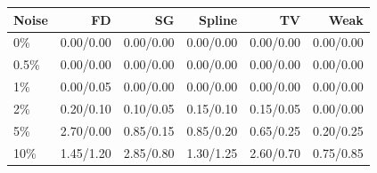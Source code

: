 \begin{tabular}{lrrrrr}\toprule
Noise & FD & SG & Spline & TV & Weak \\\midrule
0\% & 0.00/0.00 & 0.00/0.00 & 0.00/0.00 & 0.00/0.00 & 0.00/0.00 \\
0.5\% & 0.00/0.00 & 0.00/0.00 & 0.00/0.00 & 0.00/0.00 & 0.00/0.00 \\
1\% & 0.00/0.05 & 0.00/0.00 & 0.00/0.00 & 0.00/0.00 & 0.00/0.00 \\
2\% & 0.20/0.10 & 0.10/0.05 & 0.15/0.10 & 0.15/0.05 & 0.00/0.00 \\
5\% & 2.70/0.00 & 0.85/0.15 & 0.85/0.20 & 0.65/0.25 & 0.20/0.25 \\
10\% & 1.45/1.20 & 2.85/0.80 & 1.30/1.25 & 2.60/0.70 & 0.75/0.85 \\
\bottomrule\end{tabular}

